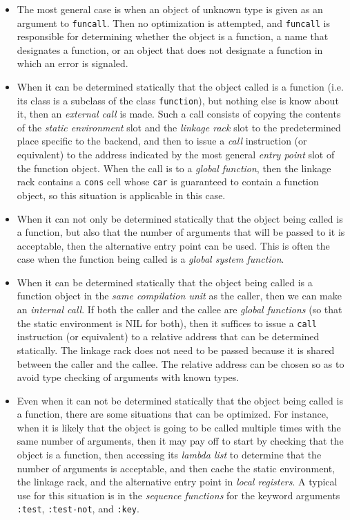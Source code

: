 \begin{itemize}
\item The most general case is when an object of unknown type is given
  as an argument to \texttt{funcall}.  Then no optimization is
  attempted, and \texttt{funcall} is responsible for determining
  whether the object is a function, a name that designates a function,
  or an object that does not designate a function in which an error is
  signaled. 
\item When it can be determined statically that the object called is a
  function (i.e. its class is a subclass of the class
  \texttt{function}), but nothing else is know about it, then an
  \emph{external call} is made.  Such a call consists of copying the
  contents of the \emph{static environment} slot and the \emph{linkage
    rack} slot to the predetermined place specific to the backend,
  and then to issue a \emph{call} instruction (or equivalent) to the
  address indicated by the most general \emph{entry point} slot of the
  function object.  When the call is to a \emph{global function}, then
  the linkage rack contains a \texttt{cons} cell whose \texttt{car}
  is guaranteed to contain a function object, so this situation is
  applicable in this case. 
\item When it can not only be determined statically that the object
  being called is a function, but also that the number of arguments
  that will be passed to it is acceptable, then the alternative entry
  point can be used.  This is often the case when the function being
  called is a \emph{global system function}. 
\item When it can be determined statically that the object being
  called is a function object in the \emph{same compilation unit} as
  the caller, then we can make an \emph{internal call}.  If both the
  caller and the callee are \emph{global functions} (so that the
  static environment is NIL for both), then it suffices to issue a
  \texttt{call} instruction (or equivalent) to a relative address that
  can be determined statically.  The linkage rack does not need to
  be passed because it is shared between the caller and the callee.
  The relative address can be chosen so as to avoid type checking of
  arguments with known types. 
\item Even when it can not be determined statically that the object
  being called is a function, there are some situations that can be
  optimized.  For instance, when it is likely that the object is going
  to be called multiple times with the same number of arguments, then
  it may pay off to start by checking that the object is a function,
  then accessing its \emph{lambda list} to determine that the number
  of arguments is acceptable, and then cache the static environment,
  the linkage rack, and the alternative entry point in \emph{local
    registers}.   A typical use for this situation is in the
  \emph{sequence functions} for the keyword arguments \texttt{:test},
  \texttt{:test-not}, and \texttt{:key}.  
\end{itemize}
